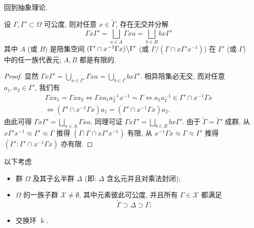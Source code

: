 回到抽象理论.
\begin{lemma}\label{prop:double-coset-decomp}
	设 $\Gamma, \Gamma' \subset \Omega$ 可公度, 则对任意 $x \in \widetilde{\Gamma}$, 存在无交并分解
	\[ \Gamma x \Gamma' = \bigsqcup_{a \in A} \Gamma x a = \bigsqcup_{b \in B} bx \Gamma' \]
	其中 $A$ (或 $B$) 是陪集空间 $(\Gamma' \cap x^{-1}\Gamma x) \big\backslash \Gamma'$ (或 $\Gamma \big/ (\Gamma \cap x \Gamma' x^{-1})$) 在 $\Gamma'$ (或 $\Gamma$) 中的任一族代表元; $A, B$ 都是有限的.
\end{lemma}
\begin{proof}
	显然 $\Gamma x \Gamma' = \bigcup_{a \in \Gamma'} \Gamma xa = \bigcup_{b \in \Gamma} bx \Gamma'$. 相异陪集必无交, 而对任意 $a_1, a_2 \in \Gamma'$, 我们有
	\begin{multline*}
		\Gamma x a_1 = \Gamma x a_2 \iff \Gamma x a_1 a_2^{-1} x^{-1} = \Gamma \iff a_1 a_2^{-1} \in \Gamma' \cap x^{-1} \Gamma x \\
		\iff (\Gamma' \cap x^{-1} \Gamma x) a_1 = (\Gamma' \cap x^{-1} \Gamma x) a_2.
	\end{multline*}
	由此可得 $\Gamma x \Gamma' = \bigsqcup_{a \in A} \Gamma xa$. 同理可证 $\Gamma x \Gamma' = \bigsqcup_{b \in B} bx \Gamma'$. 由于 $\widetilde{\Gamma} = \widetilde{\Gamma}'$ 成群, 从 $x\Gamma' x^{-1} \approx \Gamma' \approx \Gamma$ 推得 $(\Gamma: \Gamma \cap x \Gamma' x^{-1})$ 有限, 从 $x^{-1}\Gamma x \approx \Gamma \approx \Gamma'$ 推得 $(\Gamma': \Gamma' \cap x^{-1}\Gamma x)$ 亦有限.
\end{proof}

\begin{hypothesis}\label{hyp:X-groups} 
	以下考虑
	\begin{itemize}
		\item 群 $\Omega$ 及其子幺半群 $\Delta$ (即: $\Delta$ 含幺元并且对乘法封闭);
		\item $\Omega$ 的一族子群 $\mathcal{X} \neq \emptyset$, 其中元素彼此可公度, 并且所有 $\Gamma \in \mathcal{X}$ 都满足
		\[ \widetilde{\Gamma} \supset \Delta \supset \Gamma; \]
		\item 交换环 $\Bbbk$.
	\end{itemize}
\end{hypothesis}

